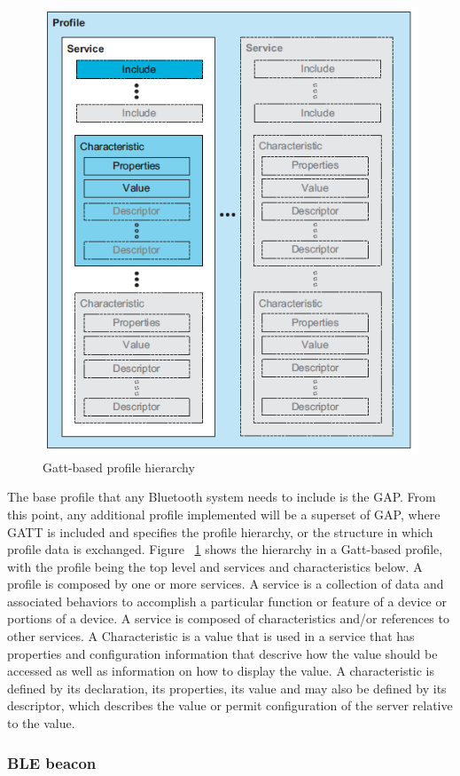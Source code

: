 \documentclass[a4paper]{IEEEtran}
\begin{document}
\begin{figure}
	\centering
		\includegraphics[width=0.5\linewidth]{figures/profile.png}
	\caption[Gatt-based profile hierarchy]{Gatt-based profile hierarchy}
	\label{fig:profile}
\end{figure}

The base profile that any Bluetooth system needs to include is the GAP. From this point, any additional profile implemented will be a superset of GAP, where GATT is included and specifies the profile hierarchy, or the structure in which profile data is exchanged. Figure  ~\ref{fig:profile} shows the hierarchy in a Gatt-based profile, with the profile being the top level and services and characteristics below. 
A profile is composed by one or more services. A service is a collection of data and associated behaviors to accomplish a particular function or feature of a device or portions of a device. A service is composed of characteristics and/or references to other services.
A Characteristic is a value that is used in a service that has properties and configuration information that descrive how the value should be accessed as well as information on how to display the value. A characteristic is defined by its declaration, its properties, its value and may also be defined by its descriptor, which describes the value or permit configuration of the server relative to the value.


\subsubsection{ BLE beacon}
\label{subsec:beacon}
\end{document}
